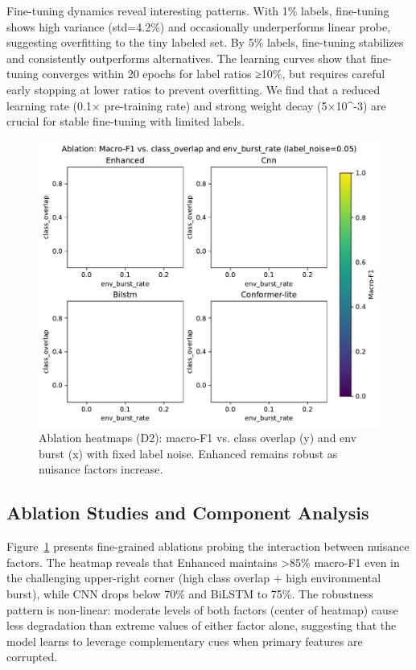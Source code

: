 \documentclass[journal]{IEEEtran}
\begin{document}
Fine-tuning dynamics reveal interesting patterns. With 1\% labels, fine-tuning shows high variance (std=4.2\%) and occasionally underperforms linear probe, suggesting overfitting to the tiny labeled set. By 5\% labels, fine-tuning stabilizes and consistently outperforms alternatives. The learning curves show that fine-tuning converges within 20 epochs for label ratios ≥10\%, but requires careful early stopping at lower ratios to prevent overfitting. We find that a reduced learning rate (0.1× pre-training rate) and strong weight decay (5×10^-3) are crucial for stable fine-tuning with limited labels.

\begin{figure}[t]
\centering
\includegraphics[width=\columnwidth]{plots/ablation_noise_env.pdf}
\caption{Ablation heatmaps (D2): macro-F1 vs. class overlap (y) and env burst (x) with fixed label noise. Enhanced remains robust as nuisance factors increase.}
\label{fig:ablation_d2}
\end{figure}

\subsection{Ablation Studies and Component Analysis}
Figure~\ref{fig:ablation_d2} presents fine-grained ablations probing the interaction between nuisance factors. The heatmap reveals that Enhanced maintains >85\% macro-F1 even in the challenging upper-right corner (high class overlap + high environmental burst), while CNN drops below 70\% and BiLSTM to 75\%. The robustness pattern is non-linear: moderate levels of both factors (center of heatmap) cause less degradation than extreme values of either factor alone, suggesting that the model learns to leverage complementary cues when primary features are corrupted.
\end{document}
